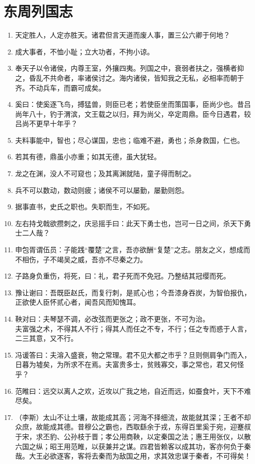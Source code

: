 \documentclass[UTF8]{ctexart}
\begin{document}
	\section{东周列国志}
		\begin{enumerate}
			\item 天定胜人，人定亦胜天。诸君但言天道而废人事，置三公六卿于何地？
			\item 成大事者，不恤小耻；立大功者，不拘小谅。
			\item 奉天子以令诸侯，内尊王室，外攘四夷。列国之中，衰弱者扶之，强横者抑之，昏乱不共命者，率诸侯讨之。海内诸侯，皆知我之无私，必相率而朝于齐。不动兵车，而霸可成矣。
			\item 奚曰：使奚逐飞鸟，搏猛兽，则臣已老；若使臣坐而策国事，臣尚少也。昔吕尚年八十，钓于渭滨，文王载之以归，拜为尚父，卒定周鼎。臣今日遇君，较吕尚不更早十年乎？
			\item 夫料事能中，智也；尽心谋国，忠也；临难不避，勇也；杀身救国，仁也。
			\item 若其有德，鼎虽小亦重；如其无德，虽大犹轻。
			\item 龙之在渊，没人不可窥也；及其离渊就陆，童子得而制之。
			\item 兵不可以数动，数动则疲；诸侯不可以屡勤，屡勤则怨。
			\item 据事直书，史氏之职也。失职而生，不如死。
			\item 左右持戈戟欲攒刺之，庆忌摇手曰：此天下勇士也，岂可一日之间，杀天下勇士二人哉？	
			\item 申包胥谓伍员：子能践“覆楚”之言，吾亦欲酬“复楚”之志。朋友之义，想成而不相伤，子不竭吴之威，吾亦不尽秦之力。
			\item 子路身负重伤，将死，曰：礼，君子死而不免冠。乃整结其冠缨而死。
			\item 豫让谢曰：吾既臣赵氏，而复行刺，是贰心也；今吾漆身吞炭，为智伯报仇，正欲使人臣怀贰心者，闻吾风而知愧耳。
			\item 鞅对曰：夫琴瑟不调，必改弦而更张之；政不更张，不可为治。\\
				夫富强之术，不得其人不行；得其人而任之不专，不行；任之专而惑于人言，二三其意，又不行。
			\item 冯谖答曰：夫溶入盛衰，物之常理。君不见大都之市乎？旦则侧肩争门而入，日暮为墟矣，为所求不在焉。夫富贵多士，贫贱寡交，事之常也，君又何怪乎？
			\item 范睢曰：远交以离人之欢，近攻以广我之地，自近而远，如蚕食叶，天下不难尽矣。
			\item （李斯）太山不让土壤，故能成其高；河海不择细流，故能就其深；王者不却众庶，故能成其德。昔穆公之霸也，西取繇余于戎，东得百里奚于宛，迎蹇叔于宋，求丕豹、公孙枝于晋；孝公用商鞅，以定秦国之法；惠王用张仪，以散六国之纵；昭王用范睢，以获兼并之谋。四君皆赖客以成其功，客亦何负于秦哉。大王必欲逐客，客将去秦而为敌国之用，求其效忠谋于秦者，不可得矣！
		\end{enumerate}
	\newpage
	
\end{document}
